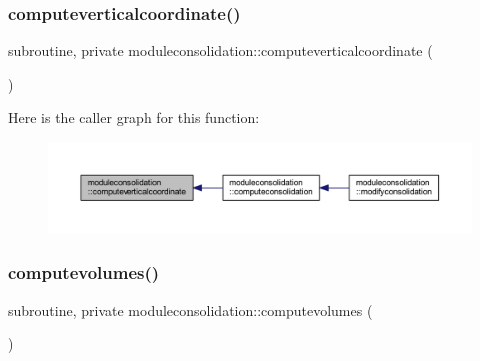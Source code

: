 \mbox{\label{namespacemoduleconsolidation_ab28fd17bb7497eb19ebb09ffb2cef27b}} 
\subsubsection{\texorpdfstring{computeverticalcoordinate()}{computeverticalcoordinate()}}
{\footnotesize\ttfamily subroutine, private moduleconsolidation\+::computeverticalcoordinate (\begin{DoxyParamCaption}{ }\end{DoxyParamCaption})\hspace{0.3cm}{\ttfamily [private]}}

Here is the caller graph for this function\+:\nopagebreak
\begin{figure}[H]
\begin{center}
\leavevmode
\includegraphics[width=350pt]{namespacemoduleconsolidation_ab28fd17bb7497eb19ebb09ffb2cef27b_icgraph}
\end{center}
\end{figure}
\mbox{\label{namespacemoduleconsolidation_a1b4a867ed2aa36040fc524aad40a9778}} 
\subsubsection{\texorpdfstring{computevolumes()}{computevolumes()}}
{\footnotesize\ttfamily subroutine, private moduleconsolidation\+::computevolumes (\begin{DoxyParamCaption}{ }\end{DoxyParamCaption})\hspace{0.3cm}{\ttfamily [private]}}

